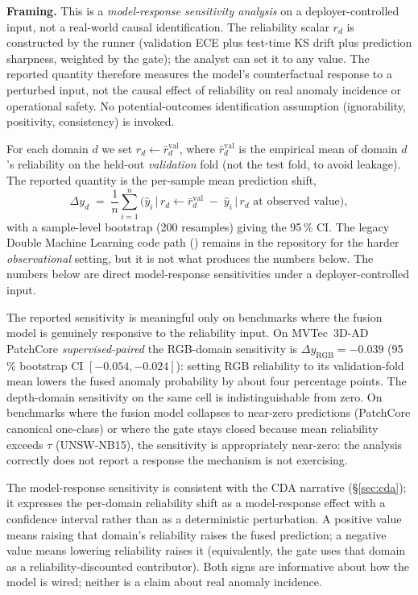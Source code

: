\documentclass[10pt,conference]{IEEEtran}
\begin{document}
\noindent\textbf{Framing.} This is a \emph{model-response sensitivity
analysis} on a deployer-controlled input, not a real-world causal
identification. The reliability scalar $r_d$ is constructed by the
runner (validation ECE plus test-time KS drift plus prediction
sharpness, weighted by the gate); the analyst can set it to any
value. The reported quantity therefore measures the model's
counterfactual response to a perturbed input, not the causal effect
of reliability on real anomaly incidence or operational safety. No
potential-outcomes identification assumption (ignorability,
positivity, consistency) is invoked.

For each domain $d$ we set $r_d \leftarrow \bar r_d^{\mathrm{val}}$,
where $\bar r_d^{\mathrm{val}}$ is the empirical mean of domain
$d$'s reliability on the held-out \emph{validation} fold (not the
test fold, to avoid leakage). The reported quantity is the per-sample
mean prediction shift,
$$
  \Delta y_d \;=\; \frac{1}{n}\sum_{i=1}^{n}\big(
    \hat y_i \,\big|\, r_d{\leftarrow}\bar r_d^{\mathrm{val}}
    \;-\;
    \hat y_i \,\big|\, r_d\text{ at observed value}
  \big),
$$
with a sample-level bootstrap (200 resamples) giving the 95\,\% CI.
The legacy Double Machine Learning code path
(\cite{chernozhukov2018doubleml}) remains in the repository for the
harder \emph{observational} setting, but it is not what produces the
numbers below. The numbers below are direct model-response
sensitivities under a deployer-controlled input.

The reported sensitivity is meaningful only on benchmarks where the
fusion model is genuinely responsive to the reliability input. On
MVTec~3D-AD PatchCore \emph{supervised-paired} the RGB-domain
sensitivity is $\Delta y_{\mathrm{RGB}}=-0.039$
(95\,\% bootstrap CI $[-0.054, -0.024]$): setting RGB reliability to
its validation-fold mean lowers the fused anomaly probability by
about four percentage points. The depth-domain sensitivity on the
same cell is indistinguishable from zero. On benchmarks where the
fusion model collapses to near-zero predictions (PatchCore canonical
one-class) or where the gate stays closed because mean reliability
exceeds $\tau$ (UNSW-NB15), the sensitivity is appropriately
near-zero: the analysis correctly does not report a response the
mechanism is not exercising.

The model-response sensitivity is consistent with the CDA narrative
(§\ref{sec:cda}); it expresses the per-domain reliability shift as
a model-response effect with a confidence interval rather than as a
deterministic perturbation. A positive value means raising that
domain's reliability raises the fused prediction; a negative value
means lowering reliability raises it (equivalently, the gate uses
that domain as a reliability-discounted contributor). Both signs are
informative about how the model is wired; neither is a claim about
real anomaly incidence.
\end{document}
